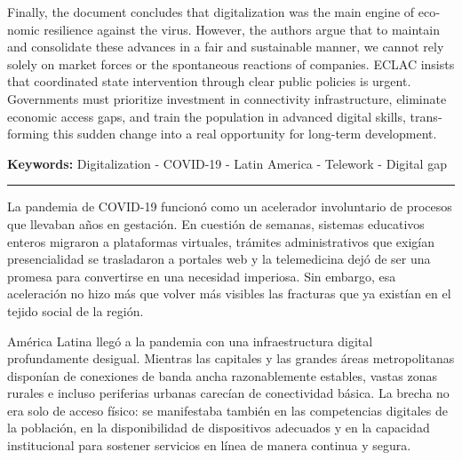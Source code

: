 \documentclass{article}
\begin{document}
\begin{tcolorbox}[colback=brown!8!white,colframe=brown!8!white,boxrule=0pt,arc=2pt,left=4pt,right=4pt,top=3pt,bottom=3pt,before skip=4pt,after skip=4pt]
\begin{otherlanguage}{english}
Finally, the document concludes that digitalization was the main engine of economic resilience against the virus. However, the authors argue that to maintain and consolidate these advances in a fair and sustainable manner, we cannot rely solely on market forces or the spontaneous reactions of companies. ECLAC insists that coordinated state intervention through clear public policies is urgent. Governments must prioritize investment in connectivity infrastructure, eliminate economic access gaps, and train the population in advanced digital skills, transforming this sudden change into a real opportunity for long-term development.
\par\smallskip\noindent\textbf{Keywords:} Digitalization - COVID-19 - Latin America - Telework - Digital gap
\end{otherlanguage}
\end{tcolorbox}

\bigskip
\noindent\rule{\linewidth}{0.4pt}
\bigskip

La pandemia de COVID-19 funcionó como un acelerador involuntario de procesos que llevaban años en gestación. En cuestión de semanas, sistemas educativos enteros migraron a plataformas virtuales, trámites administrativos que exigían presencialidad se trasladaron a portales web y la telemedicina dejó de ser una promesa para convertirse en una necesidad imperiosa. Sin embargo, esa aceleración no hizo más que volver más visibles las fracturas que ya existían en el tejido social de la región.

América Latina llegó a la pandemia con una infraestructura digital profundamente desigual. Mientras las capitales y las grandes áreas metropolitanas disponían de conexiones de banda ancha razonablemente estables, vastas zonas rurales e incluso periferias urbanas carecían de conectividad básica. La brecha no era solo de acceso físico: se manifestaba también en las competencias digitales de la población, en la disponibilidad de dispositivos adecuados y en la capacidad institucional para sostener servicios en línea de manera continua y segura.
\end{document}
